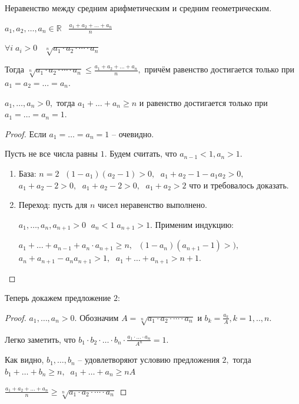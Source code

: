 \begin{Proposition}
Неравенство между средним арифметическим и средним геометрическим.

$a_1, a_2,\ldots, a_n\in\mathbb{R} \;\;\; \frac{a_1+a_2+\ldots+a_n}{n}$
\smallskip
\par $\forall i \; a_i>0 \;\;\; \sqrt[n]{a_1\cdot a_2\cdot\cdots\cdot a_n}$

\smallskip
Тогда $\sqrt[n]{a_1\cdot a_2\cdot\cdots\cdot a_n}\leq\frac{a_1+a_2+\ldots+a_n}{n},$ причём равенство достигается только при $a_1=a_2=\ldots=a_n.$
\end{Proposition}

\begin{Proposition}
$a_1,\ldots, a_n>0,$ тогда $a_1+\ldots+a_n\geq n$ и равенство достигается только при $a_1=\ldots=a_n=1.$
\end{Proposition}
\begin{proof}
Если $a_1=\ldots=a_n=1$ -- очевидно.

Пусть не все числа равны $1.$ Будем считать, что $a_{n-1}<1, a_n>1.$
\begin{enumerate}
\item База: $n=2\;$ $(1-a_1)(a_2-1)>0,\;$ $a_1+a_2-1-a_1a_2>0,\;$ $a_1+a_2-2>0,\;$ $a_1+a_2-2>0,\;$ $a_1+a_2>2$ что и требовалось доказать.
\item Переход: пусть для $n$ чисел неравенство выполнено. 

$a_1,\ldots, a_n, a_{n+1}>0\;$ $a_n<1 \; a_{n+1}>1.$ Применим индукцию:

$a_1+\ldots+a_{n-1}+a_n\cdot a_{n+1}\geq n,\;$ $(1-a_n)(a_{n+1}-1)>),\;$ $a_n+a_{n+1}-a_na_{n+1}>1,\;$ $a_1+\ldots+a_{n+1}>n+1.$  
\end{enumerate}
\end{proof}

Теперь докажем предложение $2:$
\begin{proof}
$a_1,\ldots, a_n>0.$ Обозначим $A=\sqrt[n]{a_1\cdot a_2\cdot\cdots\cdot a_n}$ и $b_k=\frac{a_k}{A}, k=1,..,n.$ 

Легко заметить, что $b_1\cdot b_2\cdot\ldots\cdot b_n\cdot\frac{a_1\cdot\ldots\cdot a_n}{A^n}=1.$

Как видно, $b_1,\ldots, b_n$ -- удовлетворяют условию предложения $2,$ тогда $b_1+\ldots+b_n\geq n, \;\; a_1+\ldots+a_n\geq nA$
\par $\frac{a_1+a_2+\ldots+a_n}{n}\geq\sqrt[n]{a_1\cdot a_2\cdot\cdots\cdot a_n}$
\end{proof}

